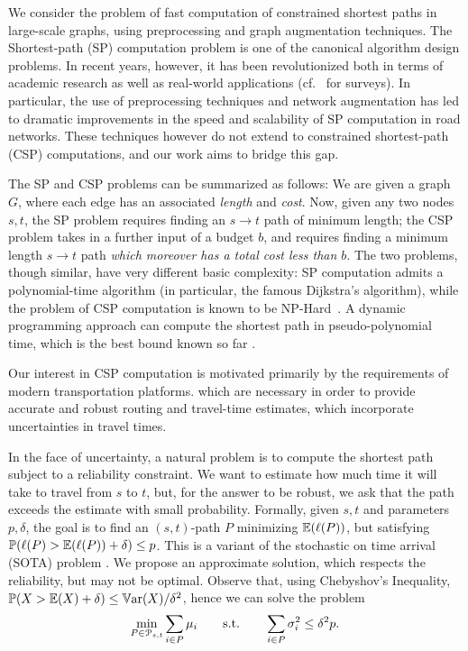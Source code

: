 

We consider the problem of fast computation of constrained shortest paths in large-scale graphs, using preprocessing and graph augmentation techniques.
The Shortest-path (SP) computation problem is one of the canonical algorithm design problems.
In recent years, however, it has been revolutionized both in terms of academic research as well as real-world applications (cf.~\cite{dimacs09,goldberg_survey} for surveys).
In particular, the use of preprocessing techniques and network augmentation has led to dramatic improvements in the speed and scalability of SP computation in road networks.
These techniques however do not extend to constrained shortest-path (CSP) computations, and our work aims to bridge this gap.


The SP and CSP problems can be summarized as follows: We are given a graph $G$, where each edge has an associated \emph{length} and \emph{cost}. 
Now, given any two nodes $s,t$, the SP problem requires finding an  $s\rightarrow t$ path of minimum length; the CSP problem takes in a further input of a budget $b$, and requires finding a minimum length $s\rightarrow t$ path \emph{which moreover has a total cost less than $b$}.
The two problems, though similar, have very different basic complexity: SP computation admits a polynomial-time algorithm (in particular, the famous Dijkstra's algorithm), while the problem of CSP computation is known to be NP-Hard~\cite{csp_survey}.
A dynamic programming approach can compute the shortest path in pseudo-polynomial time, which is the best bound known so far .


Our interest in CSP computation is motivated primarily by the requirements of modern transportation platforms. 
which are necessary in order to provide accurate and robust routing and travel-time estimates, which incorporate uncertainties in travel times.



In the face of uncertainty, a natural problem is to compute the shortest path subject to a reliability constraint.
We want to estimate how much time it will take to travel from $s$ to $t$, but, for the answer to be robust, we ask that the path exceeds the estimate with small probability.
Formally, given $s,t$ and parameters $p,\delta$, the goal is to find an $(s,t)$-path $P$ minimizing $\mathbb{E}(\ell(P))$, but satisfying $\mathbb{P}(\ell(P)>\mathbb{E}(\ell(P))+\delta)\leq p$.
This is a variant of the stochastic on time arrival (SOTA) problem \cite{fan2005arriving}.
We propose an approximate solution, which respects the reliability, but may not be optimal.
Observe that, using Chebyshov's Inequality, $\mathbb{P}(X>\mathbb{E}(X)+\delta)\leq \mathbb{V}\textnormal{ar}(X)/\delta^2$, hence we can solve
the problem 
\[
\min_{ P\in\mathcal{P}_{s,t}}\sum_{i\in P}\mu_i \qquad \text{s.t.}\qquad \sum_{i\in P}\sigma^2_i\leq \delta^2p.
\]


